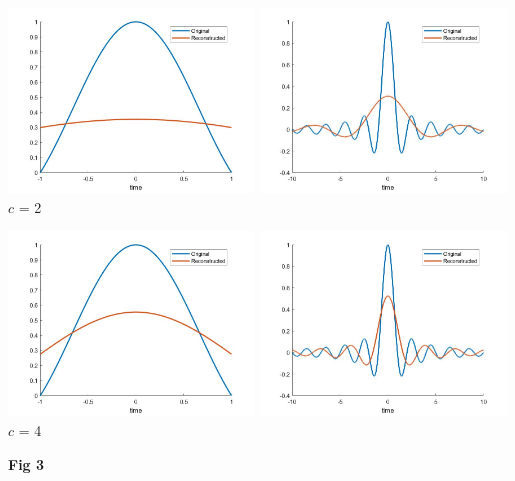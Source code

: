 \documentclass[a4paper,10pt]{article}
\begin{document}
\begin{center}
\includegraphics[width=0.49\textwidth]{"recon_tl_2.jpg"}
\includegraphics[width=0.49\textwidth]{"recon_2.jpg"}
\small{$c$ = 2}

\includegraphics[width=0.49\textwidth]{"recon_tl_4.jpg"}
\includegraphics[width=0.49\textwidth]{"recon_4.jpg"}
\small{$c$ = 4}

\textbf{Fig 3}
\end{center}
\end{document}
